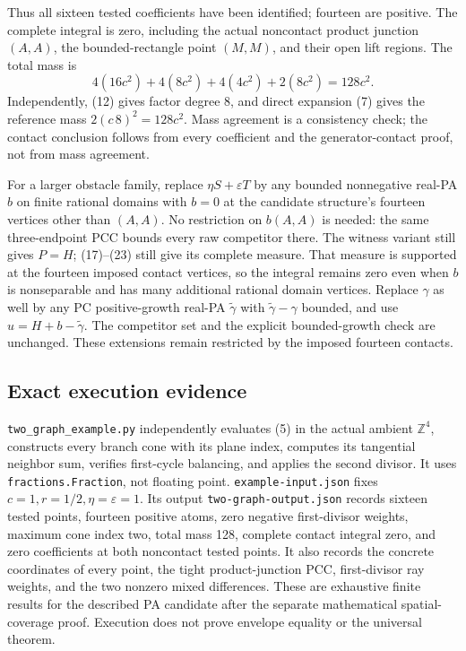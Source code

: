 \documentclass[
  10pt,
]{article}
\begin{document}
Thus all sixteen tested coefficients have been identified; fourteen are
positive. The complete integral is zero, including the actual noncontact
product junction \((A,A)\), the bounded-rectangle point \((M,M)\), and
their open lift regions. The total mass is \[
 4(16c^2)+4(8c^2)+4(4c^2)+2(8c^2)=128c^2.                  \tag{23}
\] Independently, (12) gives factor degree \(8\), and direct expansion
(7) gives the reference mass \(2(c\,8)^2=128c^2\). Mass agreement is a
consistency check; the contact conclusion follows from every coefficient
and the generator-contact proof, not from mass agreement.

For a larger obstacle family, replace \(\eta S+\varepsilon T\) by any
bounded nonnegative real-PA \(b\) on finite rational domains with
\(b=0\) at the candidate structure's fourteen vertices other than
\((A,A)\). No restriction on \(b(A,A)\) is needed: the same
three-endpoint PCC bounds every raw competitor there. The witness
variant still gives \(P=H\); (17)--(23) still give its complete measure.
That measure is supported at the fourteen imposed contact vertices, so
the integral remains zero even when \(b\) is nonseparable and has many
additional rational domain vertices. Replace \(\gamma\) as well by any
PC positive-growth real-PA \(\widetilde\gamma\) with
\(\widetilde\gamma-\gamma\) bounded, and use \(u=H+b-\widetilde\gamma\).
The competitor set and the explicit bounded-growth check are unchanged.
These extensions remain restricted by the imposed fourteen contacts.

\subsection{Exact execution evidence}\label{exact-execution-evidence}

\texttt{two\_graph\_example.py} independently evaluates (5) in the
actual ambient \(\mathbb Z^4\), constructs every branch cone with its
plane index, computes its tangential neighbor sum, verifies first-cycle
balancing, and applies the second divisor. It uses
\texttt{fractions.Fraction}, not floating point.
\texttt{example-input.json} fixes \(c=1,r=1/2,\eta=\varepsilon=1\). Its
output \texttt{two-graph-output.json} records sixteen tested points,
fourteen positive atoms, zero negative first-divisor weights, maximum
cone index two, total mass 128, complete contact integral zero, and zero
coefficients at both noncontact tested points. It also records the
concrete coordinates of every point, the tight product-junction PCC,
first-divisor ray weights, and the two nonzero mixed differences. These
are exhaustive finite results for the described PA candidate after the
separate mathematical spatial-coverage proof. Execution does not prove
envelope equality or the universal theorem.
\end{document}
